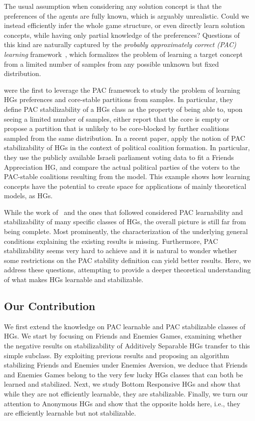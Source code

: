 \documentclass[letterpaper]{article} %
\begin{document}
The usual assumption when considering any solution concept is that the preferences of the agents are fully known, which is arguably unrealistic.
Could we instead efficiently infer the whole game structure, or even directly learn solution concepts, while having only partial knowledge of the preferences?
Questions of this kind are naturally captured by the \emph{probably approximately correct (PAC) learning} framework~\cite{Valiant84}, which formalizes the problem of learning a target concept from a limited number of samples from any possible unknown but fixed distribution.

\citet{SliwinskiZ17} were the first to leverage the PAC framework to study the problem of learning HGs preferences and core-stable partitions from samples. In particular, they define PAC stabilizability of a HGs class as the property of being able to, upon seeing a limited number of samples, either report that the core is empty or propose a partition that is unlikely to be core-blocked by further coalitions sampled from the same distribution.
In a recent paper, \citet{HG_Knesset} apply the notion of PAC stabilizability of HGs in the context of political coalition formation. In particular, they use the publicly available Israeli parliament voting data to fit a Friends Appreciation HG, and compare the actual political parties of the voters to the PAC-stable coalitions resulting from the model. This example shows how learning concepts have the potential to create space for applications of mainly theoretical models, as HGs.


While the work of~\citet{SliwinskiZ17} and the ones that followed considered PAC learnability and stabilizability of many specific classes of HGs, the overall picture is still far from being complete. Most prominently, the characterization of the underlying general conditions explaining the existing results is missing. Furthermore, PAC stabilizability seems very hard to achieve and it is natural to wonder whether some restrictions on the PAC stability definition can yield better results.
Here, we address these questions, attempting to provide a deeper theoretical understanding of what makes HGs learnable and stabilizable.

\subsection{Our Contribution}
We first extend the knowledge on PAC learnable and PAC stabilizable classes of HGs. We start by focusing on Friends and Enemies Games, examining whether the negative results on stabilizability of Additively Separable HGs transfer to this simple subclass. By exploiting previous results and proposing an algorithm stabilizing Friends and Enemies under Enemies Aversion, we deduce that Friends and Enemies Games belong to the very few lucky HGs classes that can both be learned and stabilized. Next, we study Bottom Responsive HGs and show that while they are not efficiently learnable, they are stabilizable. Finally, we turn our attention to Anonymous HGs and show that the opposite holds here, i.e., they are efficiently learnable but not stabilizable.
\end{document}
